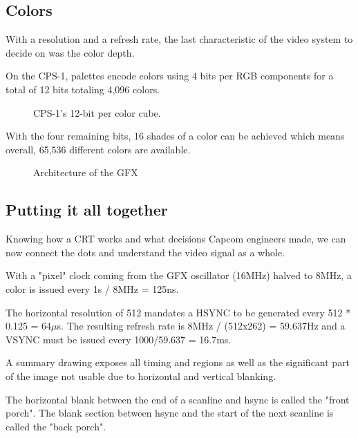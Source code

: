 \subsection{Colors}
With a resolution and a refresh rate, the last characteristic of the video system to decide on was the color depth. 

On the CPS-1, palettes encode colors using 4 bits per RGB components for a total of 12 bits totaling 4,096 colors. 


\begin{figure}[H]
\begin{minipage}[t]{0.49\linewidth}
\end{minipage}%
\hfill%
\begin{minipage}[t]{0.49\linewidth}
\end{minipage}
\caption*{CPS-1's 12-bit per color cube.}
\end{figure}
  
With the four remaining bits, 16 shades of a color can be achieved which means overall, 65,536 different colors are available.

\begin{figure}[H]
\caption*{Architecture of the GFX}
\end{figure}

\subsection{Putting it all together}

Knowing how a CRT works and what decisions Capcom engineers made, we can now connect the dots and understand the video signal as a whole.

With a "pixel" clock coming from the GFX oscillator (16MHz) halved to 8MHz, a color is issued every 1s / 8MHz = 125ns.

The horizontal resolution of 512 mandates a HSYNC to be generated every 512 * 0.125 = 64$\mu$s. The resulting refresh rate is 8MHz / (512x262) = 59.637Hz and a VSYNC must be issued every 1000/59.637 = 16.7ms.

A summary drawing exposes all timing and regions as well as the significant part of the image not usable due to horizontal and vertical blanking.

\begin{trivia}
The horizontal blank between the end of a scanline and hsync is called the "front porch". The blank section between hsync and the start of the next scanline is called the "back porch".
\end{trivia}


